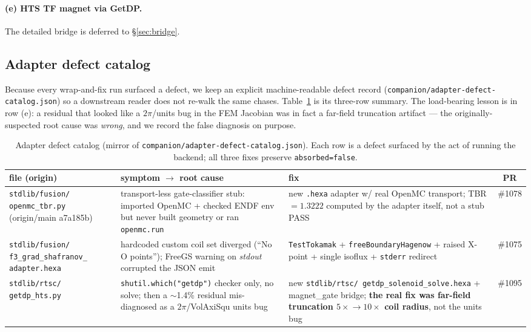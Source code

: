 \documentclass[11pt,a4paper]{article}
\begin{document}
\paragraph{(e) HTS TF magnet via GetDP.} The detailed bridge is
deferred to \S\ref{sec:bridge}.

\subsection{Adapter defect catalog}
\label{sec:defects}

Because every wrap-and-fix run surfaced a defect, we keep an explicit
machine-readable defect record (\texttt{companion/adapter-defect-catalog.json})
so a downstream reader does not re-walk the same chases.
Table~\ref{tab:defects} is its three-row summary. The load-bearing
lesson is in row (e): a residual that looked like a $2\pi$/units bug
in the FEM Jacobian was in fact a far-field truncation artifact ---
the originally-suspected root cause was \emph{wrong}, and we record the
false diagnosis on purpose.

\begin{table}[h]
\centering
\scriptsize
\begin{tabular}{@{}>{\raggedright\arraybackslash}m{2.7cm} >{\raggedright\arraybackslash}m{4.0cm} >{\raggedright\arraybackslash}m{4.4cm} c@{}}
\toprule
\textbf{file (origin)} & \textbf{symptom $\to$ root cause} & \textbf{fix} & \textbf{PR} \\
\midrule
\texttt{stdlib/fusion/ openmc\_tbr.py} (origin/main a7a185b)
  & transport-less gate-classifier stub: imported OpenMC + checked ENDF env but never built geometry or ran \texttt{openmc.run}
  & new \texttt{.hexa} adapter w/ real OpenMC transport; TBR$=1.3222$ computed by the adapter itself, not a stub PASS
  & \#1078 \\[2pt]
\texttt{stdlib/fusion/ f3\_grad\_shafranov\_ adapter.hexa}
  & hardcoded custom coil set diverged (``No O points''); FreeGS warning on \emph{stdout} corrupted the JSON emit
  & \texttt{TestTokamak} + \texttt{freeBoundaryHagenow} + raised X-point + single isoflux + \texttt{stderr} redirect
  & \#1075 \\[2pt]
\texttt{stdlib/rtsc/ getdp\_hts.py}
  & \texttt{shutil.which("getdp")} checker only, no solve; then a $\sim$1.4\% residual mis-diagnosed as a $2\pi$/VolAxiSqu units bug
  & new \texttt{stdlib/rtsc/ getdp\_solenoid\_solve.hexa} + magnet\_gate bridge; \textbf{the real fix was far-field truncation $5\times\!\to\!10\times$ coil radius}, not the units bug
  & \#1095 \\
\bottomrule
\end{tabular}
\caption{Adapter defect catalog (mirror of
\texttt{companion/adapter-defect-catalog.json}). Each row is a defect
surfaced by the act of running the backend; all three fixes preserve
\texttt{absorbed=false}.}
\label{tab:defects}
\end{table}
\end{document}
